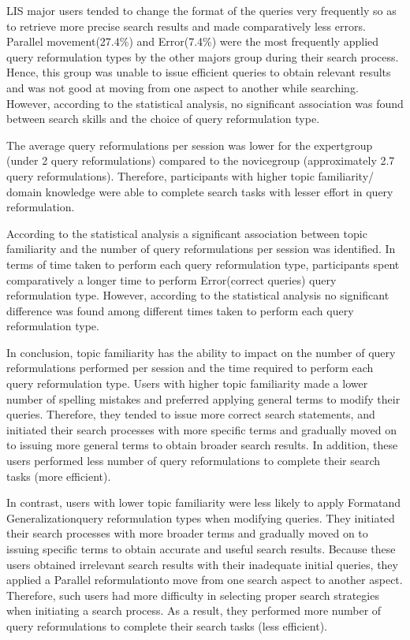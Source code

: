 \documentclass[]{article}
\begin{document}
\begin{enumerate}
LIS major users tended to change the format of the queries very frequently so as to retrieve more precise search results and made comparatively less errors. \textquotesingle Parallel movement\textquotesingle (27.4\%) and \textquotesingle Error\textquotesingle (7.4\%) were the most frequently applied query reformulation types by the other majors group during their search process. Hence, this group was unable to issue efficient queries to obtain relevant results and was not good at moving from one aspect to another while searching. However, according to the statistical analysis, no significant association was found between search skills and the choice of query reformulation type.    
 
The average query reformulations per session was lower for the \textquotesingle expert\textquotesingle group (under 2 query reformulations) compared to the \textquotesingle novice\textquotesingle group (approximately 2.7 query reformulations). Therefore, participants with higher topic familiarity/ domain knowledge were able to complete search tasks with lesser effort in query reformulation. 

According to the statistical analysis a significant association between topic familiarity and the number of query reformulations per session was identified. In terms of time taken to perform each query reformulation type, participants spent comparatively a longer time to perform \textquotesingle Error\textquotesingle (correct queries) query reformulation type. However, according to the statistical analysis no significant difference was found among different times taken to perform each query reformulation type. 

In conclusion, topic familiarity has the ability to impact on the number of query reformulations performed per session and the time required to perform each query reformulation type. Users with higher topic familiarity made a lower number of spelling mistakes and preferred applying general terms to modify their queries. Therefore, they tended to issue more correct search statements, and initiated their search processes with more specific terms and gradually moved on to issuing more general terms to obtain broader search results. In addition, these users performed less number of query reformulations to complete their search tasks (more efficient). 

In contrast, users with lower topic familiarity were less likely to apply \textquotesingle Format\textquotesingle and \textquotesingle Generalization\textquotesingle query reformulation types when modifying queries. They initiated their search processes with more broader terms and gradually moved on to issuing specific terms to obtain accurate and useful search results. Because these users obtained irrelevant search results with their inadequate initial queries, they applied a \textquotesingle Parallel reformulation\textquotesingle to move from one search aspect to another aspect. Therefore, such users had more difficulty in selecting proper search strategies when initiating a search process. As a result, they performed more number of query reformulations to complete their search tasks (less efficient). 


\end{enumerate}
\end{document}
